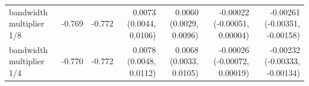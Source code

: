 \begin{tabular}{lrrrrrr}
bandwidth multiplier 1/8 & -0.769 & -0.772 & 0.0073 (0.0044, 0.0106) & 0.0060 (0.0029, 0.0096) & -0.00022 (-0.00051, 0.00004) & -0.00261 (-0.00351, -0.00158) \\
bandwidth multiplier 1/4 & -0.770 & -0.772 & 0.0078 (0.0048, 0.0112) & 0.0068 (0.0033, 0.0105) & -0.00026 (-0.00072, 0.00019) & -0.00232 (-0.00333, -0.00134) \\

\end{tabular}
